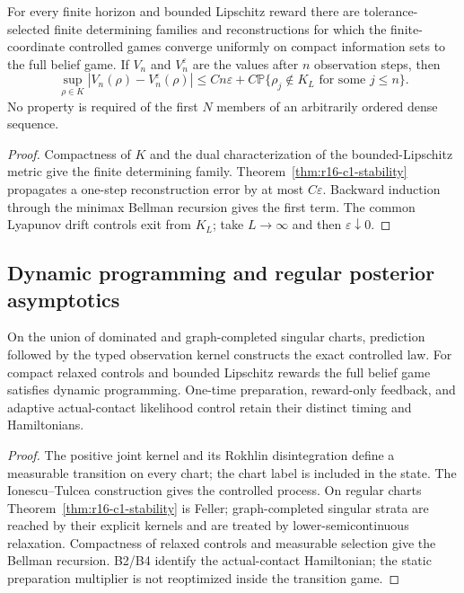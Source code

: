 \begin{theorem}
\label{thm:r16-c1-finite}
For every finite horizon and bounded Lipschitz reward there are tolerance-
selected finite determining families and reconstructions for which the
finite-coordinate controlled games converge uniformly on compact information
sets to the full belief game.  If \(V_n\) and \(V_n^\varepsilon\) are the
values after \(n\) observation steps, then
\[
 \sup_{\rho\in K}|V_n(\rho)-V_n^\varepsilon(\rho)|
 \le Cn\varepsilon+C\mathbb P\{\rho_j\notin K_L
 \text{ for some }j\le n\}.
\]
No property is required of the first \(N\) members of an arbitrarily ordered
dense sequence.
\end{theorem}

\begin{proof}
Compactness of \(K\) and the dual characterization of the bounded-Lipschitz
metric give the finite determining family.  Theorem~\ref{thm:r16-c1-stability}
propagates a one-step reconstruction error by at most \(C\varepsilon\).
Backward induction through the minimax Bellman recursion gives the first term.
The common Lyapunov drift controls exit from \(K_L\); take \(L\to\infty\) and
then \(\varepsilon\downarrow0\).
\end{proof}

\subsection{Dynamic programming and regular posterior asymptotics}

\begin{theorem}
\label{thm:r16-c1-dpp}
On the union of dominated and graph-completed singular charts, prediction
followed by the typed observation kernel constructs the exact controlled law.
For compact relaxed controls and bounded Lipschitz rewards the full belief
game satisfies dynamic programming.  One-time preparation, reward-only
feedback, and adaptive actual-contact likelihood control retain their distinct
timing and Hamiltonians.
\end{theorem}

\begin{proof}
The positive joint kernel and its Rokhlin disintegration define a measurable
transition on every chart; the chart label is included in the state.  The
Ionescu--Tulcea construction gives the controlled process.  On regular charts
Theorem~\ref{thm:r16-c1-stability} is Feller; graph-completed singular strata
are reached by their explicit kernels and are treated by lower-semicontinuous
relaxation.  Compactness of relaxed controls and measurable selection give the
Bellman recursion.  B2/B4 identify the actual-contact Hamiltonian; the static
preparation multiplier is not reoptimized inside the transition game.
\end{proof}

